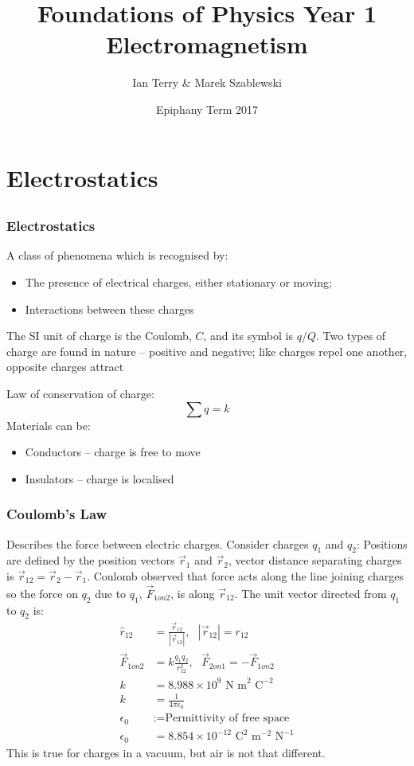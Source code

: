 \documentclass[a4paper, 11pt, normalem]{report}
\title{Foundations of Physics Year 1 \\ Electromagnetism \vspace{-20pt}}
\author{Ian Terry \& Marek Szablewski}
\date{\vspace{-15pt}Epiphany Term 2017}
\begin{document}
\maketitle
\thispagestyle{fancy}

\tableofcontents

\part{Electrostatics}
\chapter{}
\section{Electrostatics}
A class of phenomena which is recognised by: 
\begin{itemize}
    \item The presence of electrical charges, either stationary or moving;
    \item Interactions between these charges
\end{itemize}
The SI unit of charge is the Coulomb, $C$, and its symbol is $q/Q$.
Two types of charge are found in nature -- positive and negative; like charges repel one another, opposite charges attract

Law of conservation of charge:
\begin{equation}
    \sum q = k
\end{equation}
Materials can be:
\begin{itemize}
    \item Conductors -- charge is free to move
    \item Insulators -- charge is localised
\end{itemize}

\section{Coulomb's Law}
Describes the force between electric charges.
Consider charges $q_{1}$ and $q_{2}$:
Positions are defined by the position vectors $\vec{r}_{1}$ and $\vec{r}_{2}$, vector distance separating charges is $\vec{r}_{12} = \vec{r}_{2} - \vec{r}_{1}$.
Coulomb observed that force acts along the line joining charges so the force on $q_{2}$ due to $q_{1}$, $\vec{F}_{1on2}$, is along $\vec{r}_{12}$.
The unit vector directed from $q_{1}$ to $q_{2}$ is:
\begin{align}
    \hat{r}_{12} &= \frac{\vec{r}_{12}}{|\vec{r}_{12}|},~~~|\vec{r}_{12}| = r_{12} \\
    \vec{F}_{1on2} &= k\frac{q_{1}q_{2}}{r_{12}^{2}},~~~\vec{F}_{2on1} = -\vec{F}_{1on2} \\
    k &= 8.988\times10^9\text{ N m}^{2}\text{ C}^{-2} \\
    k &= \frac{1}{4\pi\epsilon_{0}} \\
    \epsilon_{0} &:= \text{Permittivity of free space} \\
    \epsilon_{0} &= 8.854\times10^{-12}\text{ C}^{2}\text{ m}^{-2}\text{ N}^{-1}
\end{align}
This is true for charges in a vacuum, but air is not that different.
\end{document}
